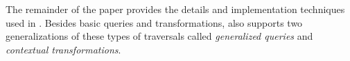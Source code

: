 

The remainder of the paper provides the details and implementation
techniques used in \Name. Besides basic queries and transformations,
\name also supports two generalizations of these types of traversals
called \emph{generalized queries} and \emph{contextual transformations}.
